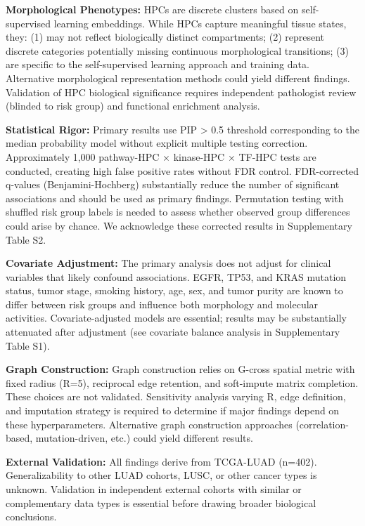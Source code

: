 \documentclass[pdflatex,article,12pt]{article}
\begin{document}
\textbf{Morphological Phenotypes:} HPCs are discrete clusters based on self-supervised learning embeddings. While HPCs capture meaningful tissue states, they: (1) may not reflect biologically distinct compartments; (2) represent discrete categories potentially missing continuous morphological transitions; (3) are specific to the self-supervised learning approach and training data. Alternative morphological representation methods could yield different findings. Validation of HPC biological significance requires independent pathologist review (blinded to risk group) and functional enrichment analysis.

\textbf{Statistical Rigor:} Primary results use PIP > 0.5 threshold corresponding to the median probability model without explicit multiple testing correction. Approximately 1,000 pathway-HPC × kinase-HPC × TF-HPC tests are conducted, creating high false positive rates without FDR control. FDR-corrected q-values (Benjamini-Hochberg) substantially reduce the number of significant associations and should be used as primary findings. Permutation testing with shuffled risk group labels is needed to assess whether observed group differences could arise by chance. We acknowledge these corrected results in Supplementary Table S2.

\textbf{Covariate Adjustment:} The primary analysis does not adjust for clinical variables that likely confound associations. EGFR, TP53, and KRAS mutation status, tumor stage, smoking history, age, sex, and tumor purity are known to differ between risk groups and influence both morphology and molecular activities. Covariate-adjusted models are essential; results may be substantially attenuated after adjustment (see covariate balance analysis in Supplementary Table S1).

\textbf{Graph Construction:} Graph construction relies on G-cross spatial metric with fixed radius (R=5), reciprocal edge retention, and soft-impute matrix completion. These choices are not validated. Sensitivity analysis varying R, edge definition, and imputation strategy is required to determine if major findings depend on these hyperparameters. Alternative graph construction approaches (correlation-based, mutation-driven, etc.) could yield different results.

\textbf{External Validation:} All findings derive from TCGA-LUAD (n=402). Generalizability to other LUAD cohorts, LUSC, or other cancer types is unknown. Validation in independent external cohorts with similar or complementary data types is essential before drawing broader biological conclusions.
\end{document}
